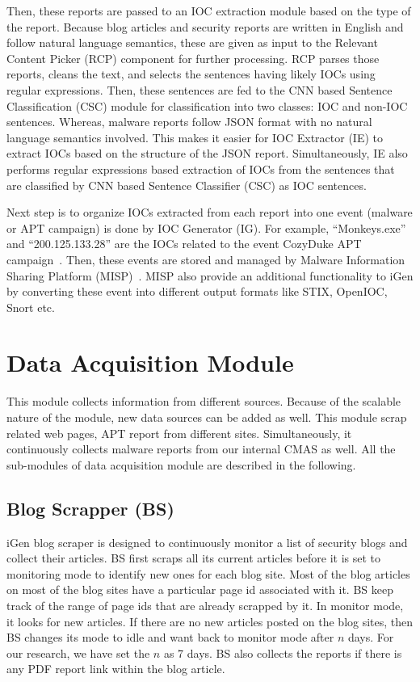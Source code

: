  Then, these reports are passed to an IOC extraction module based on the type of the report. Because blog articles and security reports are written in English and follow natural language semantics, these are given as input to the Relevant Content Picker (RCP) component for further processing. RCP parses those reports, cleans the text, and selects the sentences having likely IOCs using regular expressions. Then, these sentences are fed to the CNN based Sentence Classification (CSC) module for classification into two classes: IOC and non-IOC sentences.  Whereas, malware reports follow JSON format with no natural language semantics involved. This makes it easier for IOC Extractor (IE) to extract IOCs based on the structure of the JSON report. Simultaneously, IE also performs regular expressions based extraction of IOCs from the sentences that are classified by CNN based Sentence Classifier (CSC) as IOC sentences.    

Next step is to organize IOCs extracted from each report into one event (malware or APT campaign) is done by IOC Generator (IG). For example, “Monkeys.exe” and “200.125.133.28” are the IOCs related to the event CozyDuke APT campaign~\cite{cozyduke}. Then, these events are stored and managed by Malware Information Sharing Platform (MISP)~\cite{misp}. MISP also provide an additional functionality to iGen by converting these event into different output formats like STIX, OpenIOC, Snort etc. 
    


\section{Data Acquisition Module}
This module collects information from different sources. Because of the scalable nature of the module, new data sources can be added as well. This module scrap related web pages, APT report from different sites. Simultaneously, it continuously collects malware reports from our internal CMAS as well. All the sub-modules of data acquisition module are described in the following.

\subsection{Blog Scrapper (BS)}
iGen blog scraper is designed to continuously monitor a list of security blogs and collect their articles. BS first scraps all its current articles before it is set to monitoring mode to identify new ones for each blog site. Most of the blog articles on most of the blog sites have a particular page id associated with it. BS keep track of the range of page ids that are already scrapped by it. In monitor mode, it looks for new articles. If there are no new articles posted on the blog sites, then BS changes its mode to idle and want back to monitor mode after $n$ days. For our research, we have set the $n$ as 7 days. BS also collects the reports if there is any PDF report link within the blog article.




